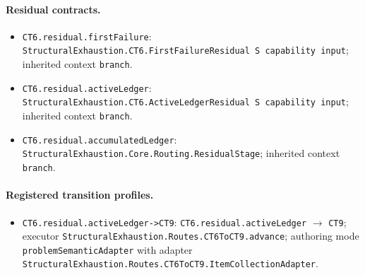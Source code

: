\begingroup\small\sloppy
\paragraph{Residual contracts.}
\begin{itemize}
\item \texttt{CT6.\allowbreak{}residual.\allowbreak{}first\allowbreak{}Failure}: \texttt{Structural\allowbreak{}Exhaustion.\allowbreak{}CT6.\allowbreak{}First\allowbreak{}Failure\allowbreak{}Residual S capability input}; inherited context \texttt{branch}.
\item \texttt{CT6.\allowbreak{}residual.\allowbreak{}active\allowbreak{}Ledger}: \texttt{Structural\allowbreak{}Exhaustion.\allowbreak{}CT6.\allowbreak{}Active\allowbreak{}Ledger\allowbreak{}Residual S capability input}; inherited context \texttt{branch}.
\item \texttt{CT6.\allowbreak{}residual.\allowbreak{}accumulated\allowbreak{}Ledger}: \texttt{Structural\allowbreak{}Exhaustion.\allowbreak{}Core.\allowbreak{}Routing.\allowbreak{}Residual\allowbreak{}Stage}; inherited context \texttt{branch}.
\end{itemize}
\paragraph{Registered transition profiles.}
\begin{itemize}
\item \texttt{CT6.\allowbreak{}residual.\allowbreak{}active\allowbreak{}Ledger-\allowbreak{}>CT9}: \texttt{CT6.\allowbreak{}residual.\allowbreak{}active\allowbreak{}Ledger} $\to$ \texttt{CT9}; executor \texttt{Structural\allowbreak{}Exhaustion.\allowbreak{}Routes.\allowbreak{}CT6\allowbreak{}To\allowbreak{}CT9.\allowbreak{}advance}; authoring mode \texttt{problem\allowbreak{}Semantic\allowbreak{}Adapter} with adapter \texttt{Structural\allowbreak{}Exhaustion.\allowbreak{}Routes.\allowbreak{}CT6\allowbreak{}To\allowbreak{}CT9.\allowbreak{}Item\allowbreak{}Collection\allowbreak{}Adapter}.
\end{itemize}
\endgroup
